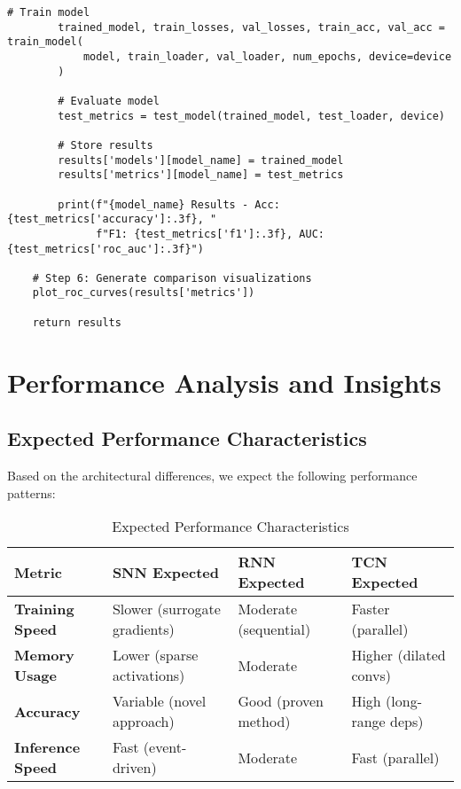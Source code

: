 \documentclass[12pt,a4paper]{article}
\begin{document}
\begin{lstlisting}[caption={Complete Pipeline Implementation - System Orchestrator Function}]
        # Train model
        trained_model, train_losses, val_losses, train_acc, val_acc = train_model(
            model, train_loader, val_loader, num_epochs, device=device
        )

        # Evaluate model
        test_metrics = test_model(trained_model, test_loader, device)

        # Store results
        results['models'][model_name] = trained_model
        results['metrics'][model_name] = test_metrics

        print(f"{model_name} Results - Acc: {test_metrics['accuracy']:.3f}, "
              f"F1: {test_metrics['f1']:.3f}, AUC: {test_metrics['roc_auc']:.3f}")

    # Step 6: Generate comparison visualizations
    plot_roc_curves(results['metrics'])

    return results
\end{lstlisting}

\section{Performance Analysis and Insights}

\subsection{Expected Performance Characteristics}

Based on the architectural differences, we expect the following performance patterns:

\begin{table}[H]
\centering
\begin{tabular}{|l|p{3cm}|p{3cm}|p{3cm}|}
\hline
\textbf{Metric} & \textbf{SNN Expected} & \textbf{RNN Expected} & \textbf{TCN Expected} \\
\hline
\textbf{Training Speed} & Slower (surrogate gradients) & Moderate (sequential) & Faster (parallel) \\
\hline
\textbf{Memory Usage} & Lower (sparse activations) & Moderate & Higher (dilated convs) \\
\hline
\textbf{Accuracy} & Variable (novel approach) & Good (proven method) & High (long-range deps) \\
\hline
\textbf{Inference Speed} & Fast (event-driven) & Moderate & Fast (parallel) \\
\hline
\end{tabular}
\caption{Expected Performance Characteristics}
\end{table}
\end{document}
